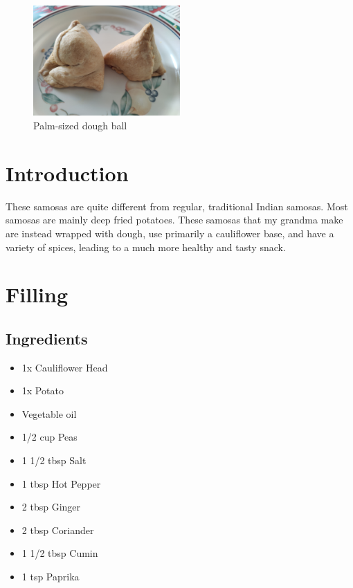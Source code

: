 
\maketitle

\begin{figure}[H]
  \centering
  \includegraphics[width=0.5\textwidth]{Samosa/Images/IMG_20231230_154205.jpg}
  \caption{Palm-sized dough ball}
  \label{fig:fig1}
\end{figure}

\section*{Introduction}

These samosas are quite different from regular, traditional Indian samosas. Most samosas are mainly deep fried potatoes. These samosas that my grandma make are instead wrapped with dough, use primarily a cauliflower base, and have a variety of spices, leading to a much more healthy and tasty snack.

\section*{Filling}

\subsection*{Ingredients}
\begin{itemize}
  \item 1x Cauliflower Head
  \item 1x Potato
  \item Vegetable oil
  \item 1/2 cup Peas
  \item 1 1/2 tbsp Salt
  \item 1 tbsp Hot Pepper
  \item 2 tbsp Ginger
  \item 2 tbsp Coriander
  \item 1 1/2 tbsp Cumin
  \item 1 tsp Paprika
\end{itemize}

